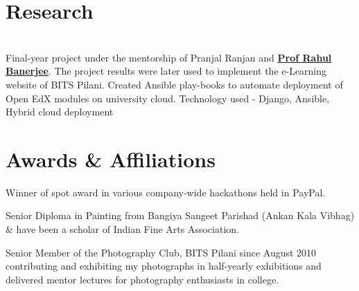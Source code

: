 \documentclass[]{deedy-resume-openfont}
\begin{document}
\begin{minipage}[t]{0.66\textwidth}

\section{Research}
\vspace{\topsep}
 \\
Final-year project under the mentorship of Pranjal Ranjan and \textbf{\href{http://www.cs.cornell.edu/~asaxena/}{Prof Rahul Banerjee}}. 
The project results were later used to implement the e-Learning website of BITS Pilani.
Created Ansible play-books to automate deployment of Open EdX modules on university cloud. Technology used - Django, Ansible, Hybrid cloud deployment
\sectionsep



\section{Awards \& Affiliations} 
\begin{tightemize}\vspace{\topsep}
\item Winner of spot award in various company-wide hackathons held in PayPal.
\item Senior Diploma in Painting from Bangiya Sangeet Parishad (Ankan Kala Vibhag) \& have been a scholar of Indian Fine Arts Association.
\item Senior Member of the Photography Club, BITS Pilani since August 2010 contributing and exhibiting my photographs in half-yearly exhibitions and delivered mentor lectures for photography enthusiasts in college.
\end{tightemize}
\sectionsep

\end{minipage} 
\end{document}
